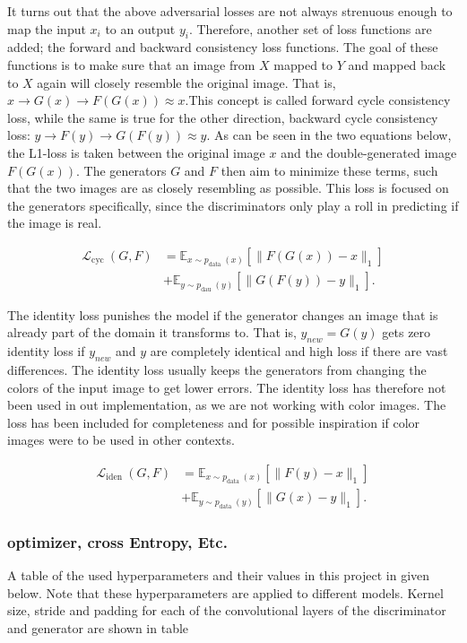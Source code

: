 \documentclass[12pt, fleqn, titlepage]{article}
\begin{document}
It turns out that the above adversarial losses are not always strenuous enough to map the input $x_i$ to an output $y_i$. Therefore, another set of loss functions are added; the forward and backward consistency loss functions. The goal of these functions is to make sure that an image from $X$ mapped to $Y$ and mapped back to $X$ again will closely resemble the original image. That is, $x \rightarrow G(x) \rightarrow F(G(x)) \approx x$.This concept is called forward cycle consistency loss, while the same is true for the other direction, backward cycle consistency loss: $y \rightarrow F(y) \rightarrow G(F(y)) \approx y$. As can be seen in the two equations below, the L1-loss is taken between the original image $x$ and the double-generated image $F(G(x))$. The generators $G$ and $F$ then aim to minimize these terms, such that the two images are as closely resembling as possible. This loss is focused on the generators specifically, since the discriminators only play a roll in predicting if the image is real.

\[\begin{aligned}
	\mathcal{L}_{\text {cyc }}(G, F) &=\mathbb{E}_{x \sim p_{\text {data }}(x)}\left[\|F(G(x))-x\|_{1}\right] \\
	&+\mathbb{E}_{y \sim p_{\text {dau }}(y)}\left[\|G(F(y))-y\|_{1}\right] .
\end{aligned}\]

The identity loss punishes the model if the generator changes an image that is already part of the domain it transforms to. That is, $y_{new} = G(y)$ gets zero identity loss if $y_{new}$ and $y$ are completely identical and high loss if there are vast differences. The identity loss usually keeps the generators from changing the colors of the input image to get lower errors. The identity loss has therefore not been used in out implementation, as we are not working with color images. The loss has been included for completeness and for possible inspiration if color images were to be used in other contexts.

\[\begin{aligned}
	\mathcal{L}_{\text {iden }}(G, F) &=\mathbb{E}_{x \sim p_{\text {data }}(x)}\left[\|F(y)-x\|_{1}\right] \\
	&+\mathbb{E}_{y \sim p_{\text {data }}(y)}\left[\|G(x)-y\|_{1}\right] .
\end{aligned}\]


\subsubsection{optimizer, cross Entropy, Etc.}
A table of the used hyperparameters and their values in this project in given below. Note that these hyperparameters are applied to different models. Kernel size, stride and padding for each of the convolutional layers of the discriminator and generator are shown in table %
\end{document}
